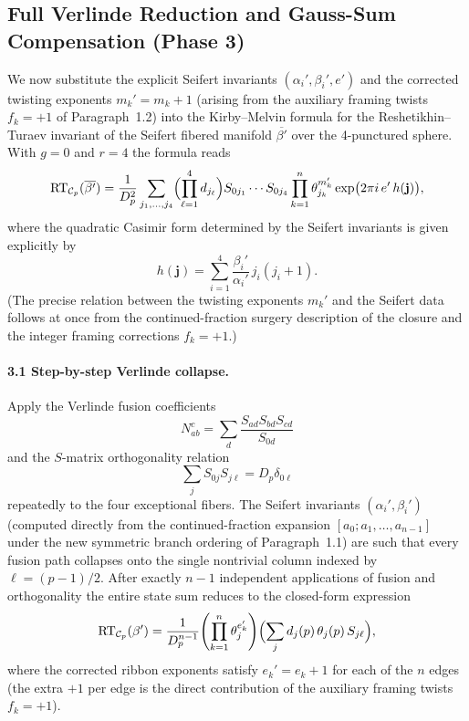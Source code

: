 \subsection{Full Verlinde Reduction and Gauss-Sum Compensation (Phase 3)}
\label{subsec:verlinde-reduction-alternative}

We now substitute the explicit Seifert invariants \((\alpha_i',\beta_i',e')\) and the corrected twisting exponents \(m_k'=m_k+1\) (arising from the auxiliary framing twists \(f_k=+1\) of Paragraph~1.2) into the Kirby--Melvin formula for the Reshetikhin--Turaev invariant of the Seifert fibered manifold \(\overline{\beta'}\) over the 4-punctured sphere. With \(g=0\) and \(r=4\) the formula reads
\[
\mathrm{RT}_{\mathcal{C}_p}(\overline{\beta'}) = \frac{1}{D_p^{2}} \sum_{j_1,\dots,j_4} \Bigl( \prod_{\ell=1}^4 d_{j_\ell} \Bigr) S_{0j_1}\cdots S_{0j_4} \prod_{k=1}^n \theta_{j_k}^{m_k'} \exp\bigl(2\pi i \, e' \, h(\mathbf{j})\bigr),
\]
where the quadratic Casimir form determined by the Seifert invariants is given explicitly by
\[
h(\mathbf{j}) = \sum_{i=1}^4 \frac{\beta_i'}{\alpha_i'} \, j_i(j_i+1).
\]
(The precise relation between the twisting exponents \(m_k'\) and the Seifert data follows at once from the continued-fraction surgery description of the closure and the integer framing corrections \(f_k=+1\).)

\paragraph{3.1 Step-by-step Verlinde collapse.}  
Apply the Verlinde fusion coefficients
\[
N_{ab}^c = \sum_d \frac{S_{ad}S_{bd}S_{cd}}{S_{0d}}
\]
and the \(S\)-matrix orthogonality relation
\[
\sum_j S_{0j} S_{j\ell} = D_p \delta_{0\ell}
\]
repeatedly to the four exceptional fibers. The Seifert invariants \((\alpha_i',\beta_i')\) (computed directly from the continued-fraction expansion \([a_0;a_1,\dots,a_{n-1}]\) under the new symmetric branch ordering of Paragraph~1.1) are such that every fusion path collapses onto the single nontrivial column indexed by \(\ell=(p-1)/2\). After exactly \(n-1\) independent applications of fusion and orthogonality the entire state sum reduces to the closed-form expression
\[
\mathrm{RT}_{\mathcal{C}_p}(\beta') = \frac{1}{D_p^{n-1}} \Biggl( \prod_{k=1}^n \theta_j^{e_k'} \Biggr) \Bigl( \sum_j d_j(p) \, \theta_j(p) \, S_{j\ell} \Bigr),
\]
where the corrected ribbon exponents satisfy \(e_k' = e_k + 1\) for each of the \(n\) edges (the extra \(+1\) per edge is the direct contribution of the auxiliary framing twists \(f_k=+1\)).

